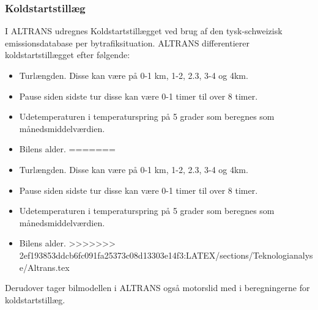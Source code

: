 \subsubsection{Koldstartstillæg}
I ALTRANS udregnes Koldstartstillægget ved brug af den tysk-schweizisk emissionsdatabase per bytrafiksituation. ALTRANS differentierer koldstartstillægget efter følgende:

\begin{itemize}
<<<<<<< HEAD:LATEX/sections/Teknologianalyse/altransWTF.tex
	\item Turlængden. Disse kan være på 0-1 km, 1-2, 2.3, 3-4 og 4km.
	\item Pause siden sidste tur disse kan være 0-1 timer til over 8 timer.
	\item Udetemperaturen i temperaturspring på 5 grader som beregnes som månedsmiddelværdien.
	\item Bilens alder.
=======
\item Turlængden. Disse kan være på 0-1 km, 1-2, 2.3, 3-4 og 4km.
\item Pause siden sidste tur disse kan være 0-1 timer til over 8 timer.
\item Udetemperaturen i temperaturspring på 5 grader som beregnes som månedsmiddelværdien.
\item Bilens alder.
>>>>>>> 2ef193853ddcb6fc091fa25373c08d13303e14f3:LATEX/sections/Teknologianalyse/Altrans.tex
\end{itemize}

Derudover tager bilmodellen i ALTRANS også motorslid med i beregningerne for koldstartstillæg.
